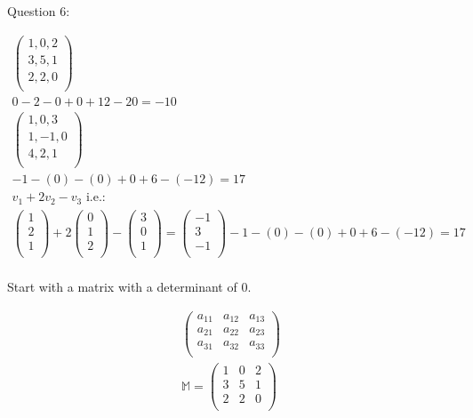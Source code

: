 \documentclass{article}
\begin{document}
Question 6:

\begin{align}
    \begin{pmatrix}1, 0, 2 \\
        3,5,1   \\
        2,2,0   \\
    \end{pmatrix}            \\
    0 - 2 - 0 + 0 + 12 - 20 = -10     \\
    \begin{pmatrix}
        1 , 0 , 3 \\
        1, -1, 0  \\
        4, 2, 1   \\
    \end{pmatrix}                    \\
    -1 -(0) -(0) + 0  + 6 -(-12) = 17 \\
    v_1 + 2v_2 - v_3 \textrm{ i.e.:}  \\
    \begin{pmatrix} 1 \\ 2 \\ 1 \\ \end{pmatrix} + 2 \begin{pmatrix} 0 \\ 1 \\ 2 \\ \end{pmatrix} - \begin{pmatrix} 3 \\ 0 \\ 1 \\ \end{pmatrix} = \begin{pmatrix} -1 \\ 3 \\ -1 \\ \end{pmatrix}
    -1 -(0) -(0) + 0 + 6 -(-12) = 17  \\
\end{align}

Start with a matrix with a determinant of 0.

\begin{align}
    \begin{pmatrix}
        a_11 & a_12 & a_13 \\
        a_21 & a_22 & a_23 \\
        a_31 & a_32 & a_33 \\
    \end{pmatrix} \\
    \mathbb{M} =
    \begin{pmatrix}
        1 & 0 & 2 \\
        3 & 5 & 1 \\
        2 & 2 & 0 \\
    \end{pmatrix}
\end{align}
\end{document}

